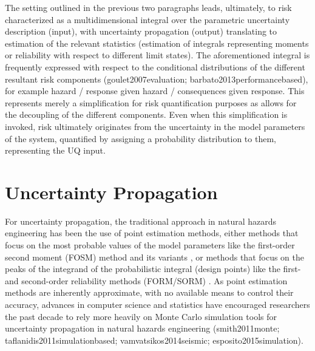 The setting outlined in the previous two paragraphs leads, ultimately, to risk characterized as a multidimensional integral over the parametric uncertainty description (input), with uncertainty propagation (output) translating to estimation of the relevant statistics (estimation of integrals representing moments or reliability with respect to different limit states). The aforementioned integral is frequently expressed with respect to the conditional distributions of the different resultant risk components (goulet2007evaluation; barbato2013performancebased), for example {hazard / response given hazard / consequences given response}. This represents merely a simplification for risk quantification purposes as allows for the decoupling of the different components. Even when this simplification is invoked, risk ultimately originates from the uncertainty in the model parameters of the system, quantified by assigning a probability distribution to them, representing the UQ input. 

\section{Uncertainty Propagation}
\label{sec:uq_propagation}

For uncertainty propagation, the traditional approach in natural hazards engineering has been the use of point estimation methods, either methods that focus on the most probable values of the model parameters like the first-order second moment (FOSM) method \citep{baker2008uncertainty} and its variants \citep{vamvatsikos2013derivation}, or methods that focus on the peaks of the integrand of the probabilistic integral (design points) like the first- and second-order reliability methods (FORM/SORM) \citep{koduru2010feasibility}. As point estimation methods are inherently approximate, with no available means to control their accuracy, advances in computer science and statistics have encouraged researchers the past decade to rely more heavily on Monte Carlo simulation tools for uncertainty propagation in natural hazards engineering (smith2011monte; taflanidis2011simulationbased; vamvatsikos2014seismic; esposito2015simulation). 

